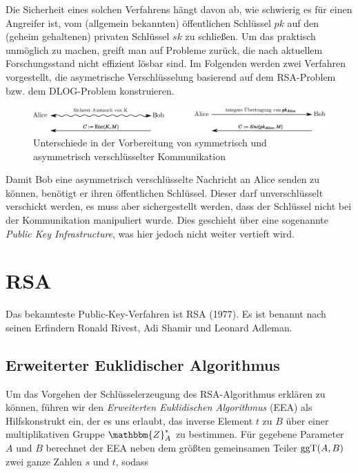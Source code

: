 Die Sicherheit eines solchen Verfahrens hängt davon ab, wie schwierig es
für einen Angreifer ist, vom (allgemein bekannten) öffentlichen
Schlüssel $pk$ auf den (geheim gehaltenen) privaten Schlüssel $sk$ zu
schließen. Um das praktisch unmöglich zu machen, greift man auf Probleme
zurück, die nach aktuellem Forschungsstand nicht effizient lösbar
sind. Im Folgenden werden zwei Verfahren vorgestellt, die asymetrische
Verschlüsselung basierend auf dem RSA-Problem bzw. dem DLOG-Problem
konstruieren. 

\begin{figure}
\includegraphics[width=\textwidth]{images/vergleich-symmetrisch-asymmetrisch.eps}
\caption{Unterschiede in der Vorbereitung von symmetrisch und
  asymmetrisch verschlüsselter Kommunikation}
\label{fig:asymmenc-symmenc}
\end{figure}
Damit Bob eine asymmetrisch verschlüsselte Nachricht an Alice senden zu
können, benötigt er ihren öffentlichen Schlüssel. Dieser darf
unverschlüsselt verschickt werden, es muss aber sichergestellt werden,
dass der Schlüssel nicht bei der Kommunikation manipuliert wurde. Dies
geschieht über eine sogenannte \textit{Public Key Infrastructure}, was
hier jedoch nicht weiter vertieft wird.
\section{RSA}
Das bekannteste Public-Key-Verfahren ist RSA (1977). Es ist benannt nach seinen
Erfindern Ronald Rivest, Adi Shamir und Leonard Adleman.

\subsection{Erweiterter Euklidischer Algorithmus}
\label{ssec:eea}
Um das Vorgehen der Schlüsselerzeugung des RSA-Algorithmus erklären zu
können, führen wir den \emph{Erweiterten Euklidischen Algorithmus} (EEA)
als Hilfskonstrukt ein, der es uns erlaubt, das inverse Element $t$ zu
$B$ über einer multiplikativen Gruppe $\mathbbm{Z}^{\ast}_{A}$ zu
bestimmen. Für gegebene Parameter $A$ und $B$ berechnet der EEA neben
dem größten gemeinsamen Teiler $\operatorname{ggT}(A, B)$ zwei ganze Zahlen $s$ und $t$, sodass 


